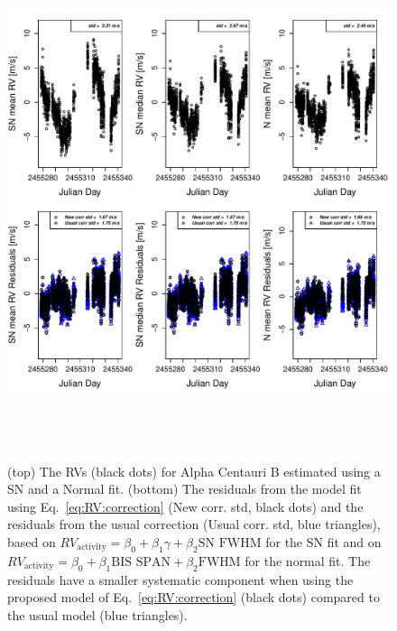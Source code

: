 \documentclass{aa}
\begin{document}
\begin{figure} 
\begin{center}
\includegraphics[height = 6in]{NEW_CORRECTIONHD12862_[3]CorrectionActivity_RadialVelocity_vs_time.pdf} 
   \caption{(top) The RVs (black dots) for Alpha Centauri B estimated using a SN and a Normal fit.
 (bottom) The residuals from the model fit using Eq.~\ref{eq:RV:correction} (New corr. std, black dots) and the residuals from the usual correction (Usual corr. std, blue triangles), based on $RV_{\text{activity}}=\beta_0+\beta_1 \gamma + \beta_2 \text{SN FWHM}$ for the SN fit and on $RV_{\text{activity}}=\beta_0+\beta_1 \text{BIS SPAN} + \beta_2 \text{FWHM}$ for the normal fit. The residuals have a smaller systematic component when using the proposed model of 
  Eq.~\ref{eq:RV:correction} (black dots) compared to the usual model (blue triangles).}
   \label{fig:alphacent:correctionRV}
\end{center}
\end{figure}
\end{document}
